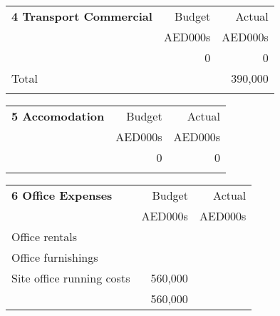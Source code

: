 \documentclass[oneside]{scrbook}
\makeatletter
\def\dotfill{%
\color{spot!50}%
\leavevmode
\cleaders \hb@xt@ 4pt{\hss \resizebox{1.5pt}{!}{\char"25CF}\relax\hss}\hfill
\kern\z@}%
\newcommand{\DotRow}[2]{%
\hbox to \columnwidth{\rule[-3pt]{0pt}{6pt}\dotfill}\break
}
\makeatother
\begin{document}
\bigskip
\parindent0pt
\begin{tabularx}{\linewidth}{Xrr}
{\color{spot!50}\textbf{4 Transport Commercial}}                                                 &Budget   &Actual\\
                                                                               &AED000s &AED000s\\
 \noalign{\DotRow{}{}}    
               &0 &0\\
               
\noalign{\DotRow{}{}}                                                                                  
Total												& &390,000 \\
\noalign{\DotRow{}{}}
 \end{tabularx}    
\vspace*{1.8cm}





\begin{tabularx}{\linewidth}{Xrr}
\textbf{5 Accomodation}                                        &Budget   &Actual\\
                                                                               &AED000s &AED000s\\
 \noalign{\DotRow{}{}}    
               &0 &0\\
\noalign{\DotRow{}{}}                                                                                  
												& & \\
 \end{tabularx}    
\vspace*{1.8cm}


\begin{tabularx}{\linewidth}{Xrr}
\textbf{6 Office Expenses}                                        &Budget   &Actual\\
                                                                               &AED000s &AED000s\\
 \noalign{\DotRow{}{}}                                                                                 
Office rentals									&	&\\
Office furnishings								&	&\\
Site office running costs							&560,000 &\\
\noalign{\DotRow{}{}}                                                                                  
												&560,000 & \\
\end{tabularx}    
\vspace*{1.8cm}
\end{document}
